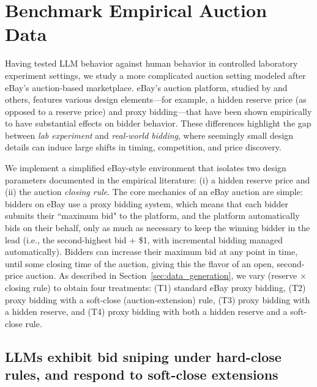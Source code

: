 \section{Benchmark Empirical Auction Data }\label{session:ebay}

Having tested LLM behavior against human behavior in controlled laboratory experiment settings, we study a more complicated auction setting modeled after eBay's  auction-based marketplace. eBay's auction platform, studied by \citet{einav2011learning} and others, features various design elements---for example, a hidden reserve price (as opposed to a reserve price)
and proxy bidding---that 
have been shown empirically to have substantial effects on bidder behavior. 
These differences highlight the gap between \textit{lab experiment} and \textit{real-world bidding}, where seemingly small design details can induce large shifts in timing, competition, and price discovery.

We implement a simplified eBay-style environment that isolates two design parameters documented in the empirical literature: (i) a hidden reserve price and (ii) the auction \emph{closing rule}. The core mechanics of an eBay auction are simple: bidders on eBay use a proxy bidding system, which means that each bidder submits their ``maximum bid" to the platform, and the platform automatically bids on their behalf, only as much as necessary to keep the winning bidder in the lead (i.e., the second-highest bid + \$1, with incremental bidding managed automatically).
Bidders can increase their maximum bid at any point in time, until some closing time of 
the auction, giving this the flavor
of an open, second-price auction.
As described in Section~\ref{sec:data_generation}, we vary (reserve $\times$ closing rule) to obtain four treatments: (T1) standard eBay proxy bidding, (T2) proxy bidding with a soft-close (auction-extension) rule, (T3) proxy bidding with a hidden reserve, and (T4) proxy bidding with both a hidden reserve and a soft-close rule.


\subsection{LLMs exhibit bid sniping under hard-close rules, and respond to soft-close extensions}\label{sec:ebay_sniping}


